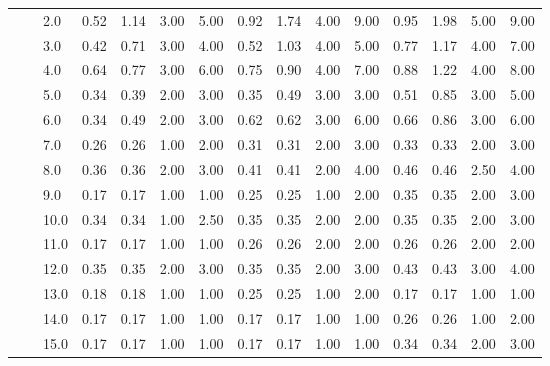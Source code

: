\begin{tabular}{lllrrrrrrrrrrrr}
           &     & 2.0  &       0.52 &      1.14 & 3.00 &   5.00 &       0.92 &      1.74 & 4.00 &   9.00 &       0.95 &      1.98 & 5.00 &   9.00 \\
           &     & 3.0  &       0.42 &      0.71 & 3.00 &   4.00 &       0.52 &      1.03 & 4.00 &   5.00 &       0.77 &      1.17 & 4.00 &   7.00 \\
           &     & 4.0  &       0.64 &      0.77 & 3.00 &   6.00 &       0.75 &      0.90 & 4.00 &   7.00 &       0.88 &      1.22 & 4.00 &   8.00 \\
           &     & 5.0  &       0.34 &      0.39 & 2.00 &   3.00 &       0.35 &      0.49 & 3.00 &   3.00 &       0.51 &      0.85 & 3.00 &   5.00 \\
           &     & 6.0  &       0.34 &      0.49 & 2.00 &   3.00 &       0.62 &      0.62 & 3.00 &   6.00 &       0.66 &      0.86 & 3.00 &   6.00 \\
           &     & 7.0  &       0.26 &      0.26 & 1.00 &   2.00 &       0.31 &      0.31 & 2.00 &   3.00 &       0.33 &      0.33 & 2.00 &   3.00 \\
           &     & 8.0  &       0.36 &      0.36 & 2.00 &   3.00 &       0.41 &      0.41 & 2.00 &   4.00 &       0.46 &      0.46 & 2.50 &   4.00 \\
           &     & 9.0  &       0.17 &      0.17 & 1.00 &   1.00 &       0.25 &      0.25 & 1.00 &   2.00 &       0.35 &      0.35 & 2.00 &   3.00 \\
           &     & 10.0 &       0.34 &      0.34 & 1.00 &   2.50 &       0.35 &      0.35 & 2.00 &   2.00 &       0.35 &      0.35 & 2.00 &   3.00 \\
           &     & 11.0 &       0.17 &      0.17 & 1.00 &   1.00 &       0.26 &      0.26 & 2.00 &   2.00 &       0.26 &      0.26 & 2.00 &   2.00 \\
           &     & 12.0 &       0.35 &      0.35 & 2.00 &   3.00 &       0.35 &      0.35 & 2.00 &   3.00 &       0.43 &      0.43 & 3.00 &   4.00 \\
           &     & 13.0 &       0.18 &      0.18 & 1.00 &   1.00 &       0.25 &      0.25 & 1.00 &   2.00 &       0.17 &      0.17 & 1.00 &   1.00 \\
           &     & 14.0 &       0.17 &      0.17 & 1.00 &   1.00 &       0.17 &      0.17 & 1.00 &   1.00 &       0.26 &      0.26 & 1.00 &   2.00 \\
           &     & 15.0 &       0.17 &      0.17 & 1.00 &   1.00 &       0.17 &      0.17 & 1.00 &   1.00 &       0.34 &      0.34 & 2.00 &   3.00 \\

\end{tabular}

